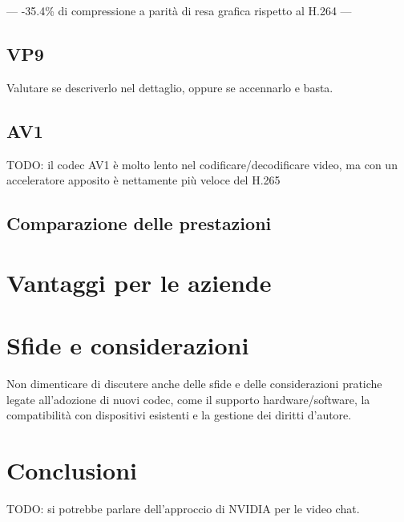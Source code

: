 \documentclass[a4paper,12pt, oneside]{article}
\begin{document}
---
-35.4\% di compressione a parità di resa grafica rispetto al H.264
---

\subsection{VP9}    %
Valutare se descriverlo nel dettaglio, oppure se accennarlo e basta.

\subsection{AV1}
TODO: il codec AV1 è molto lento nel codificare/decodificare video, ma con un acceleratore apposito è nettamente più veloce del H.265

\subsection{Comparazione delle prestazioni}

\section{Vantaggi per le aziende}

\section{Sfide e considerazioni}
Non dimenticare di discutere anche delle sfide e delle considerazioni pratiche legate all'adozione di nuovi codec, come il supporto hardware/software, la compatibilità con dispositivi esistenti e la gestione dei diritti d'autore.

\section{Conclusioni}
TODO: si potrebbe parlare dell'approccio di NVIDIA per le video chat.
\end{document}
